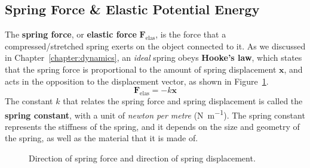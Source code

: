 \subsection{Spring Force \& Elastic Potential Energy}
The \textbf{spring force}, or \textbf{elastic force} $\bm F_\text{elas}$, is
the force that a compressed/stretched spring exerts on the object connected to
it. As we discussed in Chapter~\ref{chapter:dynamics}, an \emph{ideal} spring
obeys \textbf{Hooke's law}, which states that the spring force is proportional
to the amount of spring displacement $\bm x$, and acts in the opposition to the
displacement vector, as shown in Figure~\ref{hooke1}.
\begin{equation*}
  \bm F_\text{elas}=-k\bm x
\end{equation*}
The constant $k$ that relates the spring force and spring displacement is
called the \textbf{spring constant}, with a unit of \emph{newton per metre}
(\si{\newton\per\metre}). The spring constant represents the stiffness of the
spring, and it depends on the size and geometry of the spring, as well as the
material that it is made of.
\begin{figure}[ht]
  \centering
  \hspace{.2in}
  \caption{Direction of spring force and direction of spring displacement.}
  \label{hooke1}
\end{figure}


